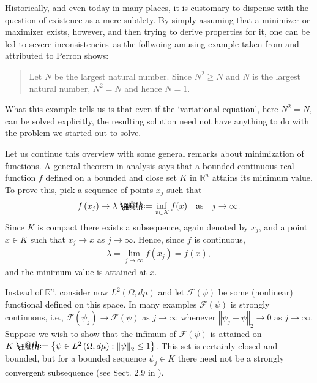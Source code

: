 \documentclass[openany, a4paper, oneside]{book}
\makeatletter
\newcommand*{\defeq}{\mathrel{\rlap{%
\raisebox{0.3ex}{$\m@th\cdot$}}%
\raisebox{-0.3ex}{$\m@th\cdot$}}%
=}
\theoremstyle{break}
\theoremstyle{breakdefn}
\newcommand{\norm}[1]{\left\Vert#1\right\Vert}
\newcommand{\rbk}[1]{\left (#1\right)}
\newcommand{\set}[2]{\left\{#1 : #2\right\}}
\newcommand{\bbR}{\mathbb{R}}
\newcommand{\calF}{\mathcal{F}}
\newcommand{\dmu}{d \mu}
\makeatother
\begin{document}
Historically, and even today in many places, it is customary to dispense with the question of existence as a mere subtlety.
By simply assuming that a minimizer or maximizer exists, however, and then trying to derive
properties for it, one can be led to severe inconsistencies--as the follwoing amusing example
taken from \cite{LaurenceYoung1} and attributed to Perron shows:
\begin{quote}
Let $N$ be the largest natural number.
Since $N^2 \geq N$ and $N$ is the largest natural number, $N^2 = N$ and hence $N=1$.
\end{quote}

What this example tells us is that even if the `variational equation', here $N^2 = N$, can be solved explicitly,
the resulting solution need not have anything to do with the problem we started out to solve.

Let us continue this overview with some general remarks about minimization of functions.
A general theorem in analysis says that a bounded continuous real function $f$ defined on a bounded and close set $K$
in $\bbR^n$ attains its minimum value.
To prove this, pick a sequence of points $x_j$ such that
\begin{align}
 f \rbk{x_j} \to \lambda
 \defeq
 \inf_{x \in K} f (x) \quad \text{as} \quad j \to \infty.
\end{align}
Since $K$ is compact there exists a subsequence, again denoted by $x_j$, and a point $x \in K$ such that $x_j \to x$ as $j \to \infty$.
Hence, since $f$ is continuous,
\begin{align}
 \lambda
 =
 \lim_{j \to \infty} f (x_j) = f (x),
\end{align}
and the minimum value is attained at $x$.

Instead of $\bbR^n$, consider now $L^2 \rbk{\Omega, \dmu}$ and let $\calF \rbk{\psi}$ be some (nonlinear) functional
defined on this space.
In many examples $\calF (\psi)$ is strongly continuous, i.e., $\calF (\psi_j) \to \calF \rbk{\psi}$ as $j \to \infty$
whenever $\norm{\psi_j - \psi}_2 \to 0$ as $j \to \infty$.
Suppose we wish to show that the infimum of $\calF (\psi)$ is attained on $K \defeq \set{\psi \in L^2 \rbk{\Omega, \dmu}}{\norm{\psi}_2 \leq 1}$.
This set is certainly closed and bounded, but for a bounded sequence $\psi_j \in K$
there need not be a strongly convergent subsequence (see Sect. 2.9 in \cite{LiebLoss1}).
\end{document}
